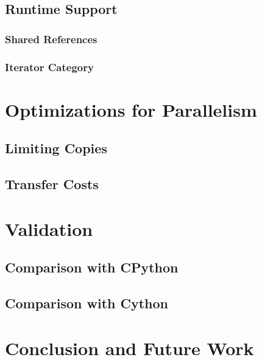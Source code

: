 \documentclass{llncs}
\begin{document}
\subsection{Runtime Support}

\subsubsection{Shared References}

\subsubsection{Iterator Category}

\section{Optimizations for Parallelism}\label{sec:python-optim}

\subsection{Limiting Copies}

\subsection{Transfer Costs}

\section{Validation}\label{sec:validation}

\subsection{Comparison with CPython}

\subsection{Comparison with Cython}

\section{Conclusion and Future Work}



\end{document}
